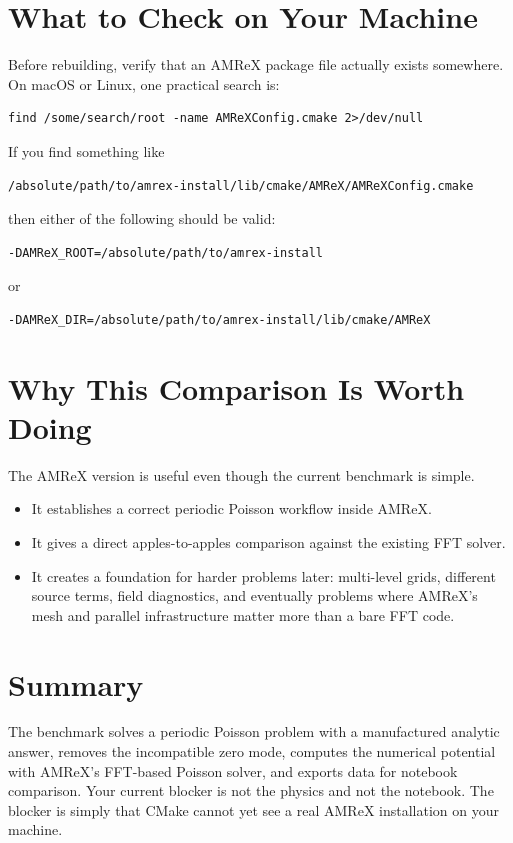\documentclass[11pt]{article}
\begin{document}
\section{What to Check on Your Machine}
Before rebuilding, verify that an AMReX package file actually exists somewhere. On macOS or Linux, one practical search is:
\begin{verbatim}
find /some/search/root -name AMReXConfig.cmake 2>/dev/null
\end{verbatim}
If you find something like
\begin{verbatim}
/absolute/path/to/amrex-install/lib/cmake/AMReX/AMReXConfig.cmake
\end{verbatim}
then either of the following should be valid:
\begin{verbatim}
-DAMReX_ROOT=/absolute/path/to/amrex-install
\end{verbatim}
or
\begin{verbatim}
-DAMReX_DIR=/absolute/path/to/amrex-install/lib/cmake/AMReX
\end{verbatim}

\section{Why This Comparison Is Worth Doing}
The AMReX version is useful even though the current benchmark is simple.
\begin{itemize}
\item It establishes a correct periodic Poisson workflow inside AMReX.
\item It gives a direct apples-to-apples comparison against the existing FFT solver.
\item It creates a foundation for harder problems later: multi-level grids, different source terms, field diagnostics, and eventually problems where AMReX's mesh and parallel infrastructure matter more than a bare FFT code.
\end{itemize}

\section*{Summary}
The benchmark solves a periodic Poisson problem with a manufactured analytic answer, removes the incompatible zero mode, computes the numerical potential with AMReX's FFT-based Poisson solver, and exports data for notebook comparison. Your current blocker is not the physics and not the notebook. The blocker is simply that CMake cannot yet see a real AMReX installation on your machine.
\end{document}
